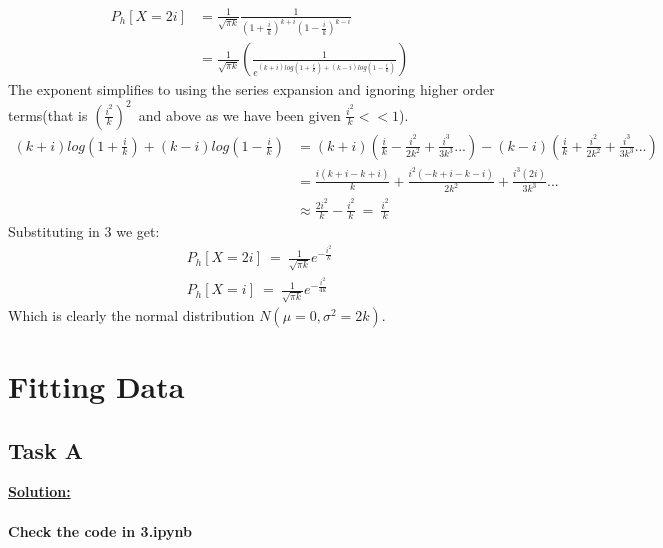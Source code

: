 \documentclass[12pt]{article}
\begin{document}
\begin{equation}
\begin{split}
    P_{h}[X=2i] &=\frac{1}{\sqrt{\pi k}}\frac{1}{(1+\frac{i}{k})^{k+i}(1-\frac{i}{k})^{k-i}} \\
                &=\frac{1}{\sqrt{\pi k}}\left(\frac{1}{e^{(k+i)log(1+\frac{i}{k})+(k-i)log(1-\frac{i}{k})}}\right)
\end{split}
\end{equation}
The exponent simplifies to using the series expansion and ignoring higher order terms(that is $(\frac{i^2}{k})^2$\ and above as we have been given $\frac{i^2}{k}<<1$). 
\begin{equation}
\begin{split}
    (k+i)log(1+\frac{i}{k})+(k-i)log(1-\frac{i}{k}) &= (k+i)(\frac{i}{k}-\frac{i^2}{2k^2}+\frac{i^3}{3k^3}...)-(k-i)(\frac{i}{k}+\frac{i^2}{2k^2}+\frac{i^3}{3k^3}...)\\
                                                    &= \frac{i(k+i-k+i)}{k}+\frac{i^2(-k+i-k-i)}{2k^2}+\frac{i^3(2i)}{3k^3}...\\
                                                    &\approx \frac{2i^2}{k}-\frac{i^2}{k}\ =\ \frac{i^2}{k}
\end{split}
\end{equation}
Substituting in 3 we get:
\begin{equation}
    \begin{split}
        P_{h}[X=2i]\ =\ \frac{1}{\sqrt{\pi k}}e^{-\frac{i^2}{k}} \\
        P_{h}[X=i]\ =\ \frac{1}{\sqrt{\pi k}}e^{-\frac{i^2}{4k}}
    \end{split}
\end{equation}
Which is clearly the normal distribution $N(\mu=0,\sigma^{2}=2k)$.

\section{Fitting Data}
\subsection{Task A}
\textbf{\underline{Solution:}}\\
\\
\textbf{Check the code in 3.ipynb}
\end{document}
